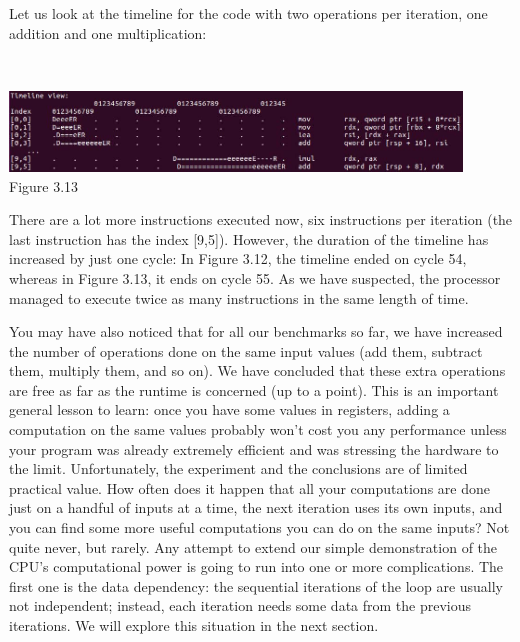 Let us look at the timeline for the code with two operations per iteration, one addition and one multiplication:

\hspace*{\fill} \\ %
\begin{center}
\includegraphics[width=0.9\textwidth]{content/1/chapter3/images/13.jpg}\\
Figure 3.13
\end{center}

There are a lot more instructions executed now, six instructions per iteration (the last instruction has the index [9,5]). However, the duration of the timeline has increased by just one cycle: In Figure 3.12, the timeline ended on cycle 54, whereas in Figure 3.13, it ends on cycle 55. As we have suspected, the processor managed to execute twice as many instructions in the same length of time.

You may have also noticed that for all our benchmarks so far, we have increased the number of operations done on the same input values (add them, subtract them, multiply them, and so on). We have concluded that these extra operations are free as far as the runtime is concerned (up to a point). This is an important general lesson to learn: once you have some values in registers, adding a computation on the same values probably won't cost you any performance unless your program was already extremely efficient and was stressing the hardware to the limit. Unfortunately, the experiment and the conclusions are of limited practical value. How often does it happen that all your computations are done just on a handful of inputs at a time, the next iteration uses its own inputs, and you can find some more useful computations you can do on the same inputs? Not quite never, but rarely. Any attempt to extend our simple demonstration of the CPU's computational power is going to run into one or more complications. The first one is the data dependency: the sequential iterations of the loop are usually not independent; instead, each iteration needs some data from the previous iterations. We will explore this situation in the next section.

















